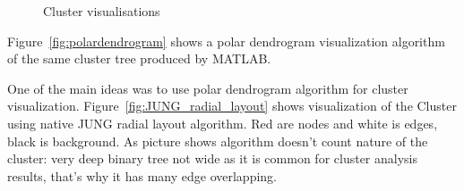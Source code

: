 \begin{figure}[h!]
\centering
{}
\label{fig:dendrograms}
\caption{Cluster visualisations}
\end{figure}


Figure~\ref{fig:polardendrogram} shows a polar dendrogram visualization algorithm of the same cluster tree produced by MATLAB.

One of the main ideas was to use polar dendrogram algorithm for cluster visualization. Figure~\ref{fig:JUNG_radial_layout} shows visualization of the Cluster using native JUNG radial layout algorithm. Red are nodes and white is edges, black is background. As picture shows algorithm doesn't count nature of the cluster: very deep binary tree not wide as it is common for cluster analysis results, that's why it has many edge overlapping.



